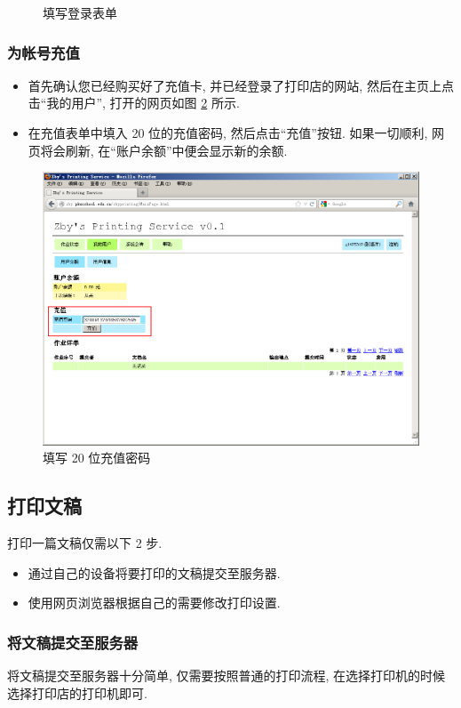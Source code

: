 \documentclass{article}
\begin{document}
\begin{CJK}{UTF8}{gbsn}
\begin{figure}[hp]
				\caption{填写登录表单}
				\label{fig:login}
			\end{figure}
			\clearpage
		\subsubsection{为帐号充值}
			\label{sec:recharge}
			\begin{itemize}
				\item{首先确认您已经购买好了充值卡, 并已经登录了打印店的网站, 然后在主页上点击``我的用户'', 打开的网页如图 \ref{fig:recharge} 所示.}
				\item{在充值表单中填入 20 位的充值密码, 然后点击``充值''按钮. 如果一切顺利, 网页将会刷新, 在``账户余额''中便会显示新的余额.}
			\end{itemize}
			
			\begin{figure}[hp]
				\centering
				\includegraphics[height=0.45\textheight]{recharge.png}
				\caption{填写 20 位充值密码}
				\label{fig:recharge}
			\end{figure}
			\clearpage
	\newpage
	\subsection{打印文稿}
		打印一篇文稿仅需以下 2 步.
		\begin{itemize}
			\item{通过自己的设备将要打印的文稿提交至服务器.}
			\item{使用网页浏览器根据自己的需要修改打印设置.}
		\end{itemize}
		
		\subsubsection{将文稿提交至服务器}
			将文稿提交至服务器十分简单, 仅需要按照普通的打印流程, 在选择打印机的时候选择打印店的打印机即可.

\end{CJK}
\end{document}
